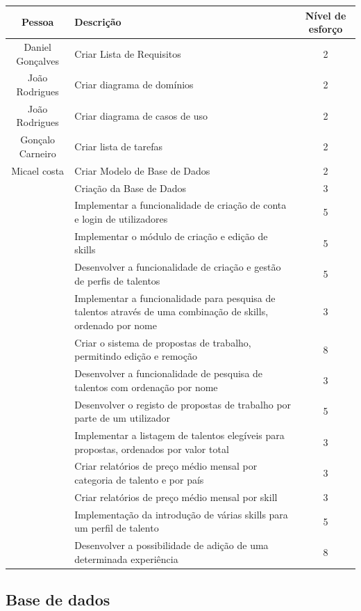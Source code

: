 \renewcommand{\arraystretch}{1.3}
\begin{center} %
\begin{longtable}{|c|p{7cm}|c|}
\hline
\textbf{Pessoa} & \textbf{Descrição} & \textbf{Nível de esforço} \\
\hline
Daniel Gonçalves & Criar Lista de Requisitos & 2 \\
\hline
João Rodrigues & Criar diagrama de domínios & 2 \\
\hline
João Rodrigues & Criar diagrama de casos de uso & 2 \\
\hline
Gonçalo Carneiro & Criar lista de tarefas & 2 \\
\hline
Micael costa & Criar Modelo de Base de Dados & 2 \\
\hline
 & Criação da Base de Dados & 3 \\
\hline
 & Implementar a funcionalidade de criação de conta e login de utilizadores & 5 \\
\hline
 & Implementar o módulo de criação e edição de skills & 5 \\
\hline
 & Desenvolver a funcionalidade de criação e gestão de perfis de talentos & 5 \\
\hline
 & Implementar a funcionalidade para pesquisa de talentos através de uma combinação de skills, ordenado por nome & 3 \\
\hline
 & Criar o sistema de propostas de trabalho, permitindo edição e remoção & 8 \\
\hline
 & Desenvolver a funcionalidade de pesquisa de talentos com ordenação por nome & 3 \\
\hline
 & Desenvolver o registo de propostas de trabalho por parte de um utilizador & 5 \\
\hline
 & Implementar a listagem de talentos elegíveis para propostas, ordenados por valor total & 3 \\
\hline
 & Criar relatórios de preço médio mensal por categoria de talento e por país & 3 \\
\hline
 & Criar relatórios de preço médio mensal por skill & 3 \\
\hline
 & Implementação da introdução de várias skills para um perfil de talento & 5 \\
\hline
 & Desenvolver a possibilidade de adição de uma determinada experiência & 8 \\
\hline
\end{longtable}
\end{center}


\subsection{Base de dados}
